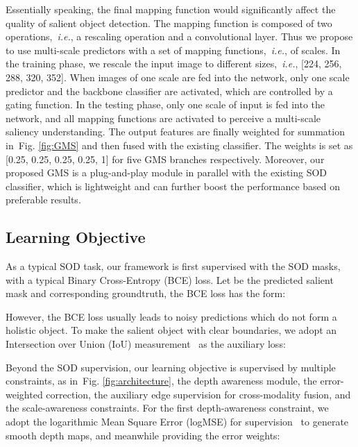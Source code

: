 \documentclass[journal]{IEEEtran}
\def\ie{{\em i.e.}}
\newcommand{\figref}[1]{Fig. \ref{#1}}
\begin{document}
Essentially speaking, the final mapping function  would significantly affect the quality of salient object detection. The mapping function is composed of two operations,~\ie, a rescaling operation and a  convolutional layer.
Thus we propose to use multi-scale predictors with a set of mapping functions,~\ie,  of  scales. In the training phase, we rescale the input image to different sizes,~\ie,  [224, 256, 288, 320, 352]. When images of one scale are fed into the network, only one scale predictor and the backbone classifier are activated, which are controlled by a gating function.  In the testing phase, only one scale of input is fed into the network, and all mapping functions are activated to perceive a multi-scale saliency understanding.
The output features are finally weighted for summation in~\figref{fig:GMS} and then fused with the existing classifier. The weights  is set as [0.25, 0.25, 0.25, 0.25, 1] for five GMS branches respectively.
Moreover, our proposed GMS is a plug-and-play module in parallel with the existing SOD classifier, which is lightweight and can further boost the performance based on preferable results.

















\subsection{Learning Objective}
As a typical SOD task, our framework is first supervised with the SOD masks, with a typical Binary Cross-Entropy (BCE) loss. Let  be the predicted salient mask and corresponding groundtruth, the BCE loss has the form:


However, the BCE loss usually leads to noisy predictions which do not form a holistic object. To make the salient object with clear boundaries, we adopt an Intersection over Union (IoU) measurement~\cite{F3Net, qin2019basnet} as the auxiliary loss:




Beyond the SOD supervision, our learning objective is supervised by multiple constraints, as in~\figref{fig:architecture}, the depth awareness module, the error-weighted correction, the auxiliary edge supervision for cross-modality fusion, and the scale-awareness constraints.
For the first depth-awareness constraint, we adopt the logarithmic Mean Square Error (logMSE) for supervision~\cite{eigen2014depth,eigen2015predicting} to generate smooth depth maps, and meanwhile providing the error weights:
\end{document}
